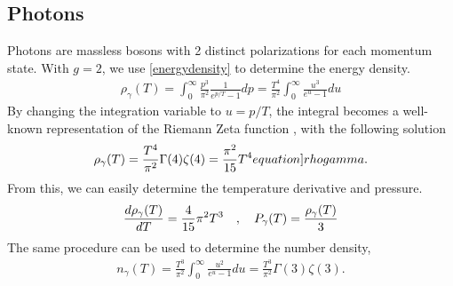 \subsection{Photons}
Photons are massless bosons with 2 distinct polarizations for each momentum state. With $g=2$, we use \eqref{energydensity} to determine the energy density. 
\begin{align}
    \rho_\gamma(T)=\int_{0}^{\infty} \frac{p^3}{\pi^2}\frac{1}{e^{p/T}-1}dp =  \frac{T^4}{\pi^2}\int_{0}^{\infty}\frac{u^3}{e^{u}-1}du
\end{align}
By changing the integration variable to $u=p/T$, the integral becomes a well-known representation of the Riemann Zeta function \cite[\href{https://dlmf.nist.gov/25.5.E1}{(25.5.1)}]{NIST:DLMF}, with the following solution
\begin{align}
    \rho_\gamma(T)=\frac{T^4}{\pi^2}\Gamma(4)\zeta(4)=\frac{\pi^2}{15}T^4
    \label[equation]{rhogamma}.
\end{align}
From this, we can easily determine the temperature derivative and pressure.
\begin{align}
    \frac{d\rho_\gamma(T)}{dT}=\frac{4}{15}\pi^2T^3 \quad , \quad P_\gamma(T)=\frac{\rho_\gamma(T)}{3}
\end{align}
The same procedure can be used to determine the number density,
\begin{align}
    n_\gamma(T)=\frac{T^3}{\pi^2}\int_{0}^{\infty}\frac{u^2}{e^{u}-1}du=\frac{T^3}{\pi^2}\Gamma(3)\zeta(3)
    \label{eq:ngamma}.
\end{align}



